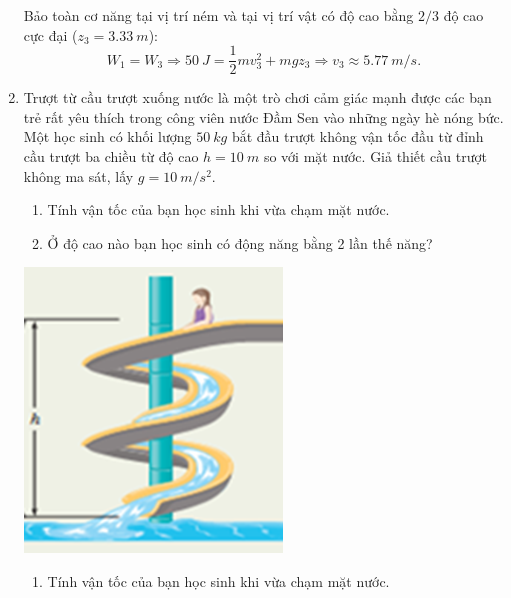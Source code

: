 \begin{enumerate}[label=\bfseries Câu \arabic*:, leftmargin=1.5cm]
{\begin{enumerate}[label=\alph*)]
			Bảo toàn cơ năng tại vị trí ném và tại vị trí vật có độ cao bằng $2/3$ độ cao cực đại ($z_3=\SI{3.33}{m}$):
			$$W_1 = W_3 \Rightarrow \SI{50}{J} = \dfrac{1}{2}mv_3^2 + mgz_3 \Rightarrow v_3 \approx \SI{5.77}{m/s}.$$
		\end{enumerate}
	}

	\item {}
	
	
	{
		\begin{minipage}[l]{0.7\textwidth}
			Trượt từ cầu trượt xuống nước là một trò chơi cảm giác mạnh được các bạn trẻ rất yêu thích trong công viên nước Đầm Sen vào những ngày hè nóng bức. Một học sinh có khối lượng $\SI{50}{kg}$ bắt đầu trượt không vận tốc đầu từ đỉnh cầu trượt ba chiều từ độ cao $h=\SI{10}{m}$ so với mặt nước. Giả thiết cầu trượt không ma sát, lấy $g=\SI{10}{m/s^2}$.
			\begin{enumerate}[label=\alph*)]
				\item Tính vận tốc của bạn học sinh khi vừa chạm mặt nước.
				\item Ở độ cao nào bạn học sinh có động năng bằng 2 lần thế năng?
			\end{enumerate}
		\end{minipage}
		\begin{minipage}[r]{0.2\textwidth}
			\begin{flushright}
				\hspace*{1cm}\includegraphics[scale=0.7]{../figs/VN10-2022-PH-TP029-1.png}
			\end{flushright}
		\end{minipage}
	}
	
	\hideall
	{	
		\begin{enumerate}[label=\alph*)]
			\item Tính vận tốc của bạn học sinh khi vừa chạm mặt nước.
			

\end{enumerate}}
\end{enumerate}
